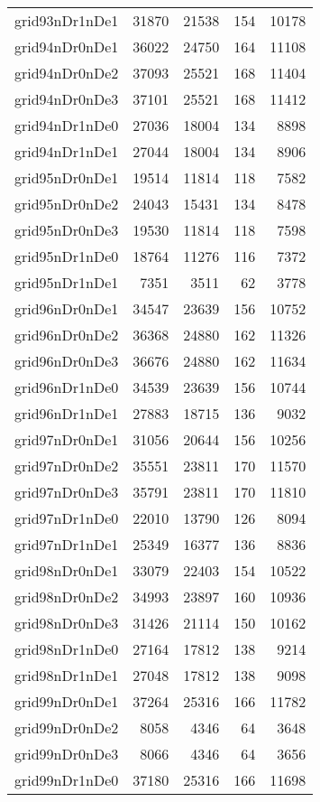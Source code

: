 \begin{longtable}{lrrrr}
grid93nDr1nDe1 & 31870 & 21538 & 154 & 10178 \\
grid94nDr0nDe1 & 36022 & 24750 & 164 & 11108 \\
grid94nDr0nDe2 & 37093 & 25521 & 168 & 11404 \\
grid94nDr0nDe3 & 37101 & 25521 & 168 & 11412 \\
grid94nDr1nDe0 & 27036 & 18004 & 134 & 8898 \\
grid94nDr1nDe1 & 27044 & 18004 & 134 & 8906 \\
grid95nDr0nDe1 & 19514 & 11814 & 118 & 7582 \\
grid95nDr0nDe2 & 24043 & 15431 & 134 & 8478 \\
grid95nDr0nDe3 & 19530 & 11814 & 118 & 7598 \\
grid95nDr1nDe0 & 18764 & 11276 & 116 & 7372 \\
grid95nDr1nDe1 & 7351 & 3511 & 62 & 3778 \\
grid96nDr0nDe1 & 34547 & 23639 & 156 & 10752 \\
grid96nDr0nDe2 & 36368 & 24880 & 162 & 11326 \\
grid96nDr0nDe3 & 36676 & 24880 & 162 & 11634 \\
grid96nDr1nDe0 & 34539 & 23639 & 156 & 10744 \\
grid96nDr1nDe1 & 27883 & 18715 & 136 & 9032 \\
grid97nDr0nDe1 & 31056 & 20644 & 156 & 10256 \\
grid97nDr0nDe2 & 35551 & 23811 & 170 & 11570 \\
grid97nDr0nDe3 & 35791 & 23811 & 170 & 11810 \\
grid97nDr1nDe0 & 22010 & 13790 & 126 & 8094 \\
grid97nDr1nDe1 & 25349 & 16377 & 136 & 8836 \\
grid98nDr0nDe1 & 33079 & 22403 & 154 & 10522 \\
grid98nDr0nDe2 & 34993 & 23897 & 160 & 10936 \\
grid98nDr0nDe3 & 31426 & 21114 & 150 & 10162 \\
grid98nDr1nDe0 & 27164 & 17812 & 138 & 9214 \\
grid98nDr1nDe1 & 27048 & 17812 & 138 & 9098 \\
grid99nDr0nDe1 & 37264 & 25316 & 166 & 11782 \\
grid99nDr0nDe2 & 8058 & 4346 & 64 & 3648 \\
grid99nDr0nDe3 & 8066 & 4346 & 64 & 3656 \\
grid99nDr1nDe0 & 37180 & 25316 & 166 & 11698 \\

\end{longtable}
